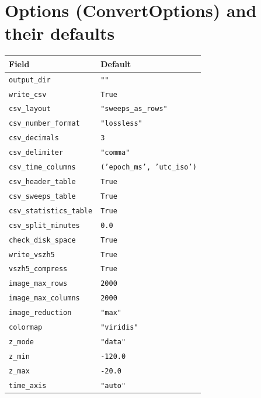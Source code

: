 \documentclass[11pt,a4paper]{article}
\begin{document}
\section{Options (ConvertOptions) and their defaults}
\begin{longtable}{p{5.6cm}p{9.6cm}}
\toprule
\textbf{Field} & \textbf{Default}\\
\midrule
\endhead
\texttt{output\_\allowbreak{}dir} & \texttt{""}\\
\texttt{write\_\allowbreak{}csv} & \texttt{True}\\
\texttt{csv\_\allowbreak{}layout} & \texttt{"sweeps\_\allowbreak{}as\_\allowbreak{}rows"}\\
\texttt{csv\_\allowbreak{}number\_\allowbreak{}format} & \texttt{"lossless"}\\
\texttt{csv\_\allowbreak{}decimals} & \texttt{3}\\
\texttt{csv\_\allowbreak{}delimiter} & \texttt{"comma"}\\
\texttt{csv\_\allowbreak{}time\_\allowbreak{}columns} & \texttt{('epoch\_\allowbreak{}ms', 'utc\_\allowbreak{}iso')}\\
\texttt{csv\_\allowbreak{}header\_\allowbreak{}table} & \texttt{True}\\
\texttt{csv\_\allowbreak{}sweeps\_\allowbreak{}table} & \texttt{True}\\
\texttt{csv\_\allowbreak{}statistics\_\allowbreak{}table} & \texttt{True}\\
\texttt{csv\_\allowbreak{}split\_\allowbreak{}minutes} & \texttt{0.0}\\
\texttt{check\_\allowbreak{}disk\_\allowbreak{}space} & \texttt{True}\\
\texttt{write\_\allowbreak{}vszh5} & \texttt{True}\\
\texttt{vszh5\_\allowbreak{}compress} & \texttt{True}\\
\texttt{image\_\allowbreak{}max\_\allowbreak{}rows} & \texttt{2000}\\
\texttt{image\_\allowbreak{}max\_\allowbreak{}columns} & \texttt{2000}\\
\texttt{image\_\allowbreak{}reduction} & \texttt{"max"}\\
\texttt{colormap} & \texttt{"viridis"}\\
\texttt{z\_\allowbreak{}mode} & \texttt{"data"}\\
\texttt{z\_\allowbreak{}min} & \texttt{-120.0}\\
\texttt{z\_\allowbreak{}max} & \texttt{-20.0}\\
\texttt{time\_\allowbreak{}axis} & \texttt{"auto"}\\

\end{longtable}
\end{document}
